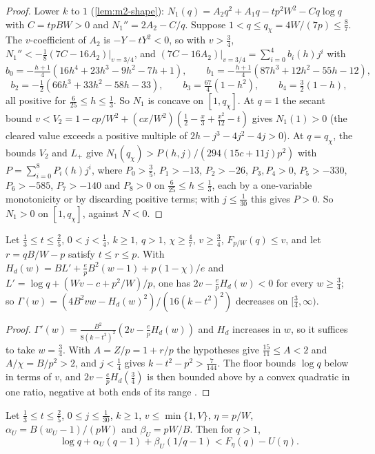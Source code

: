 \begin{proof}
Lower $k$ to $1$ (\cref{lem:m2-shape}): $N_1(q)=A_2q^2+A_1q-tp^2W^2-Cq\log q$ with $C=tpBW>0$
and $N_1''=2A_2-C/q$. Suppose $1<q\le q_\chi=4W/(7p)\le\frac87$. The $v$-coefficient of $A_2$ is
$-Y-tY^2<0$, so with $v>\frac34$, $N_1''<-\frac18(7C-16A_2)|_{v=3/4}$, and
$(7C-16A_2)|_{v=3/4}=\sum_{i=0}^4b_i(h)j^i$ with
\[
b_0=-\tfrac{h+1}4(16h^4+23h^3-9h^2-7h+1),\qquad b_1=-\tfrac{h+1}4(87h^3+12h^2-55h-12),
\]
\[
b_2=-\tfrac12(66h^3+33h^2-58h-33),\qquad b_3=\tfrac{67}4(1-h^2),\qquad b_4=\tfrac32(1-h),
\]
all positive for $\frac6{25}\le h\le\frac13$. So $N_1$ is concave on $[1,q_\chi]$. At $q=1$ the secant
bound $v<V_2=1-cp/W^2+(cx/W^2)(\frac12-\frac x3+\frac{x^2}{12}-t)$ gives $N_1(1)>0$ (the cleared value
exceeds a positive multiple of $2h-j^3-4j^2-4j>0$). At $q=q_\chi$, the bounds $V_2$ and $L_+$ give
$N_1(q_\chi)>P(h,j)/(294(15c+11j)p^2)$ with $P=\sum_{i=0}^8P_i(h)j^i$, where $P_0>\frac35$,
$P_1>-13$, $P_2>-26$, $P_3,P_4>0$, $P_5>-330$, $P_6>-585$, $P_7>-140$ and $P_8>0$ on
$\frac6{25}\le h\le\frac13$, each by a one-variable monotonicity or by discarding positive terms; with
$j\le\frac1{30}$ this gives $P>0$. So $N_1>0$ on $[1,q_\chi]$, against $N<0$.
\end{proof}

\begin{lemma}\label{lem:m2-slope}
Let $\frac13\le t\le\frac25$, $0<j<\frac14$, $k\ge1$, $q>1$, $\chi\ge\frac47$, $v\ge\frac34$,
$F_{p/W}(q)\le v$, and let $r=qB/W-p$ satisfy $t\le r\le p$. With
$H_d(w)=BL'+\frac epB^2(w-1)+p(1-\chi)/e$ and $L'=\log q+(Wv-c+p^2/W)/p$, one has
$2v-\frac epH_d(w)<0$ for every $w\ge\frac34$; so $\Gamma(w)=(4B^2vw-H_d(w)^2)/(16(k-t^2)^2)$
decreases on $[\frac34,\infty)$.
\end{lemma}

\begin{proof}
$\Gamma'(w)=\frac{B^2}{8(k-t^2)^2}(2v-\frac epH_d(w))$ and $H_d$ increases in $w$, so it suffices to
take $w=\frac34$. With $A=Z/p=1+r/p$ the hypotheses give $\frac{15}{11}\le A<2$ and $A/\chi=B/p^2>2$,
and $j<\frac14$ gives $k-t^2-p^2>\frac7{144}$. The floor bounds $\log q$ below in terms of $v$, and
$2v-\frac epH_d(\frac34)$ is then bounded above by a convex quadratic in one ratio, negative at both
ends of its range
\cite[\texttt{MIXED\_\allowbreak NONSHORT\_\allowbreak FORWARD\_\allowbreak CASIMIR\_\allowbreak MONOTONICITY}]{Notes}.
\end{proof}

\begin{lemma}\label{lem:m2-qelim}
Let $\frac13\le t\le\frac25$, $0\le j\le\frac1{30}$, $k\ge1$, $v\le\min\{1,V\}$, $\eta=p/W$,
$\alpha_U=B(w_U-1)/(pW)$ and $\beta_U=pW/B$. Then for $q>1$,
\[
\log q+\alpha_U(q-1)+\beta_U(1/q-1)<F_\eta(q)-U(\eta).
\]
\end{lemma}

